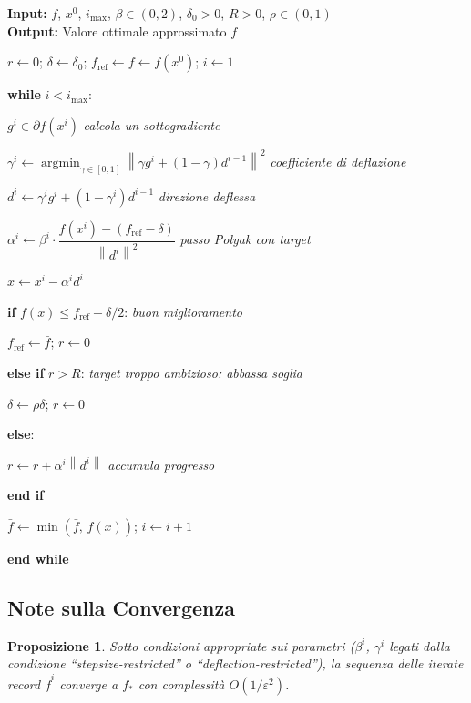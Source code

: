 \documentclass[11pt,a4paper]{article}
\theoremstyle{definition}
\theoremstyle{plain}
\newtheorem{proposition}{Proposizione}[section]
\theoremstyle{remark}
\newenvironment{pseudocode}{%
  \begin{list}{}{%
    \setlength{\leftmargin}{1.5em}%
    \setlength{\itemsep}{2pt}%
    \setlength{\parsep}{0pt}%
    \setlength{\topsep}{4pt}%
  }%
}{%
  \end{list}%
}
\newcommand{\pcline}[1]{\item[] #1}
\newcommand{\pcindent}{\hspace{1.5em}}
\newcommand{\pcindentII}{\hspace{3em}}
\newcommand{\norm}[1]{\left\| #1 \right\|}
\newcommand{\subgr}{\partial}
\newcommand{\argmin}{\operatorname*{argmin}}
\begin{document}
\begin{algobox}
  \textbf{Input:} $f$, $x^0$, $i_{\max}$, $\beta \in (0,2)$, $\delta_0 > 0$, $R > 0$, $\rho \in (0,1)$\\
  \textbf{Output:} Valore ottimale approssimato $\bar{f}$
  \begin{pseudocode}
    \pcline{$r \leftarrow 0$;\; $\delta \leftarrow \delta_0$;\;
      $f_{\text{ref}} \leftarrow \bar{f} \leftarrow f(x^0)$;\; $i \leftarrow 1$}
    \pcline{\textbf{while} $i < i_{\max}$:}
    \pcline{\pcindent $g^i \in \subgr f(x^i)$
      \hfill \textit{calcola un sottogradiente}}
    \pcline{\pcindent $\gamma^i \leftarrow \argmin_{\gamma \in [0,1]}\norm{\gamma g^i + (1-\gamma)d^{i-1}}^2$
      \hfill \textit{coefficiente di deflazione}}
    \pcline{\pcindent $d^i \leftarrow \gamma^i g^i + (1-\gamma^i)d^{i-1}$
      \hfill \textit{direzione deflessa}}
    \pcline{\pcindent $\alpha^i \leftarrow \beta^i \cdot \dfrac{f(x^i) - (f_{\text{ref}} - \delta)}{\norm{d^i}^2}$
      \hfill \textit{passo Polyak con target}}
    \pcline{\pcindent $x \leftarrow x^i - \alpha^i d^i$}
    \pcline{\pcindent \textbf{if} $f(x) \leq f_{\text{ref}} - \delta/2$:
      \hfill \textit{buon miglioramento}}
    \pcline{\pcindentII $f_{\text{ref}} \leftarrow \bar{f}$;\; $r \leftarrow 0$}
    \pcline{\pcindent \textbf{else if} $r > R$:
      \hfill \textit{target troppo ambizioso: abbassa soglia}}
    \pcline{\pcindentII $\delta \leftarrow \rho\delta$;\; $r \leftarrow 0$}
    \pcline{\pcindent \textbf{else}:}
    \pcline{\pcindentII $r \leftarrow r + \alpha^i\norm{d^i}$
      \hfill \textit{accumula progresso}}
    \pcline{\pcindent \textbf{end if}}
    \pcline{\pcindent $\bar{f} \leftarrow \min(\bar{f},\, f(x))$;\; $i \leftarrow i + 1$}
    \pcline{\textbf{end while}}
  \end{pseudocode}
\end{algobox}

\subsection{Note sulla Convergenza}

\begin{proposition}
  Sotto condizioni appropriate sui parametri ($\beta^i$, $\gamma^i$ legati dalla condizione
  ``stepsize-restricted'' o ``deflection-restricted''), la sequenza delle iterate record
  $\bar{f}^i$ converge a $f_*$ con complessità $O(1/\varepsilon^2)$.
\end{proposition}
\end{document}
